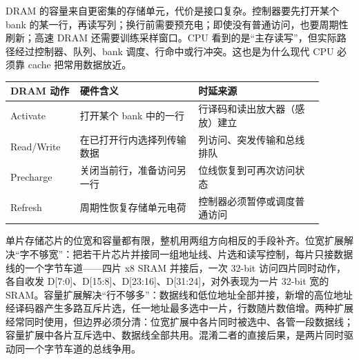 DRAM 的容量来自更密集的存储单元，代价是接口复杂。控制器要先打开某个 bank 的某一行，再读写列；换行前需要预充电；即使没有普通访问，也要周期性刷新；高速 DRAM 还需要训练采样窗口。CPU 看到的是“主存读写”，但实际路径经过控制器、队列、bank 调度、行命中或行冲突。这也是为什么现代 CPU 必须靠 cache 把常用数据放近。

\begin{longtable}{L{0.2\linewidth}L{0.34\linewidth}L{0.36\linewidth}}
\toprule
DRAM 动作 & 硬件含义 & 时延来源 \\
\midrule
Activate & 打开某个 bank 中的一行 & 行译码和读出放大器（感放）建立 \\
Read/Write & 在已打开行内选择列传输数据 & 列访问、突发传输和总线排队 \\
Precharge & 关闭当前行，准备访问另一行 & 位线恢复到可再次访问状态 \\
Refresh & 周期性恢复存储单元电荷 & 控制器必须暂停或调度普通访问 \\
\bottomrule
\end{longtable}

单片存储芯片的位宽和容量都有限，整机用两组方向相反的手段补齐。位宽扩展解决“字不够宽”：把若干片芯片并接同一组地址线、片选和读写控制，每片只接数据线的一个字节车道——四片 x8 SRAM 并接后，一次 32-bit 访问四片同时动作，各自收发 D[7:0]、D[15:8]、D[23:16]、D[31:24]，对外表现为一片 32-bit 宽的 SRAM。容量扩展解决“行不够多”：数据线和低位地址全部并接，新增的高位地址经译码器产生多路互斥片选，任一地址最多选中一片，行数随片数倍增。两种扩展经常同时使用，但边界必须分清：位宽扩展中各片同时被选中、各管一段数据线；容量扩展中各片互斥选中、数据线全部共用。混淆二者的直接后果，是两片同时驱动同一个字节车道的总线争用。

